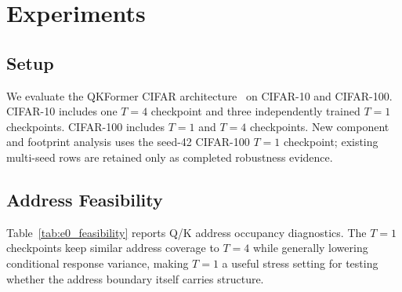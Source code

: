 \section{Experiments}
\label{sec:experiments}

\subsection{Setup}
\label{sec:setup}

We evaluate the QKFormer CIFAR architecture~\cite{zhou2024qkformer} on CIFAR-10
and CIFAR-100. CIFAR-10 includes one $T=4$ checkpoint and three independently
trained $T=1$ checkpoints. CIFAR-100 includes $T=1$ and $T=4$ checkpoints. New
component and footprint analysis uses the seed-42 CIFAR-100 $T=1$ checkpoint;
existing multi-seed rows are retained only as completed robustness evidence.

\begin{table}[t]
\centering
\footnotesize
{}
\caption{QKFormer baselines used for QK-LUTFormer diagnostics. Accuracy is
reported in percent on the corresponding validation split.}
\label{tab:qkformer_baselines}
\end{table}

\subsection{Address Feasibility}
\label{sec:address_feasibility}

Table~\ref{tab:e0_feasibility} reports Q/K address occupancy diagnostics. The
$T=1$ checkpoints keep similar address coverage to $T=4$ while generally lowering
conditional response variance, making $T=1$ a useful stress setting for testing
whether the address boundary itself carries structure.

